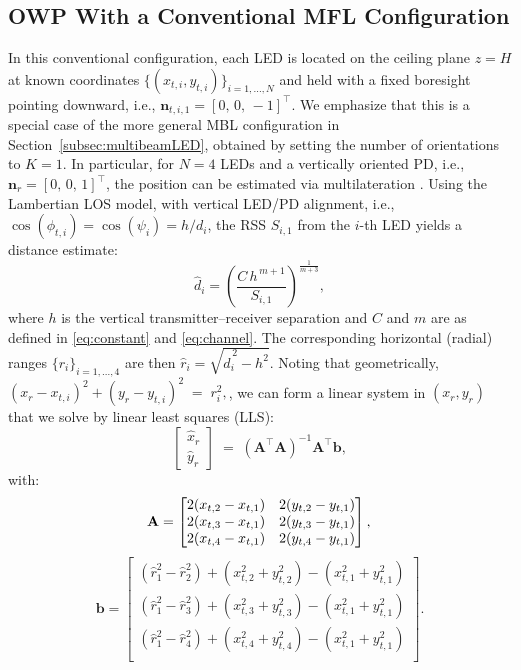\documentclass[conference]{IEEEtran}
\begin{document}
\subsection{OWP With a Conventional MFL Configuration}
\label{subsec:multiled}
In this conventional configuration, each LED is located on the ceiling plane $z=H$ at known coordinates $\{(x_{t,i},y_{t,i})\}_{i=1,\dots,N}$ and held with a fixed boresight pointing downward, i.e., $\mathbf{n}_{t,i,1} = [0,\,0,\,-1]^\top$. We emphasize that this is a special case of the more general MBL configuration in Section~\ref{subsec:multibeamLED}, obtained by setting the number of orientations to $K=1$.
%
In particular, for $N=4$ LEDs and a vertically oriented PD, i.e., $\mathbf{n}_{r} = [0,\,0,\,1]^\top$, the position can be estimated via multilateration \cite{Zhuang2018}. Using the Lambertian LOS model, with vertical LED/PD alignment, i.e., $\cos(\phi_{t,i})=\cos(\psi_i)=h/d_i$, the RSS $S_{i,1}$ from the $i$-th LED yields a distance estimate:
\begin{equation} 
\hat{d}_i= \left( \frac{C \, h^{\,m+1}} {S_{i,1}} \right)^{\tfrac{1}{m+3}}, \end{equation}
where $h$ is the vertical transmitter–receiver separation and $C$ and $m$ are as defined in \eqref{eq:constant} and \eqref{eq:channel}. The corresponding horizontal (radial) ranges $\{r_i\}_{i=1,...,4}$ are then $\hat{r}_i=\sqrt{\hat{d}_i^{\,2}-h^{2}}$. Noting that geometrically,
\(
(x_r-x_{t,i})^2 + (y_r-y_{t,i})^2 \;=\; r_i^2,
\), we can form a linear system in $(x_r,y_r)$ that we solve by linear least squares (LLS):
\begin{equation}
    \begin{bmatrix}\hat{x}_r\\[2pt]\hat{y}_r\end{bmatrix}
    \;=\;
    (\mathbf{A}^{\top}\mathbf{A})^{-1}\mathbf{A}^{\top}\mathbf{b},
\end{equation}
with:
\begin{equation}
\mathbf{A} = \begin{bmatrix}
2(x_{t,2} - x_{t,1}) & 2(y_{t,2} - y_{t,1}) \\
2(x_{t,3} - x_{t,1}) & 2(y_{t,3} - y_{t,1}) \\
2(x_{t,4} - x_{t,1}) & 2(y_{t,4} - y_{t,1})
\end{bmatrix}, \\    
\end{equation}
\begin{equation}
\mathbf{b} = \begin{bmatrix}
(\hat{r}_1^2 - \hat{r}_2^2) + (x_{t,2}^2 + y_{t,2}^2) - (x_{t,1}^2 + y_{t,1}^2) \\
(\hat{r}_1^2 - \hat{r}_3^2) + (x_{t,3}^2 + y_{t,3}^2) - (x_{t,1}^2 + y_{t,1}^2) \\
(\hat{r}_1^2 - \hat{r}_4^2) + (x_{t,4}^2 + y_{t,4}^2) - (x_{t,1}^2 + y_{t,1}^2) \\
\end{bmatrix}.    
\end{equation}
\end{document}
